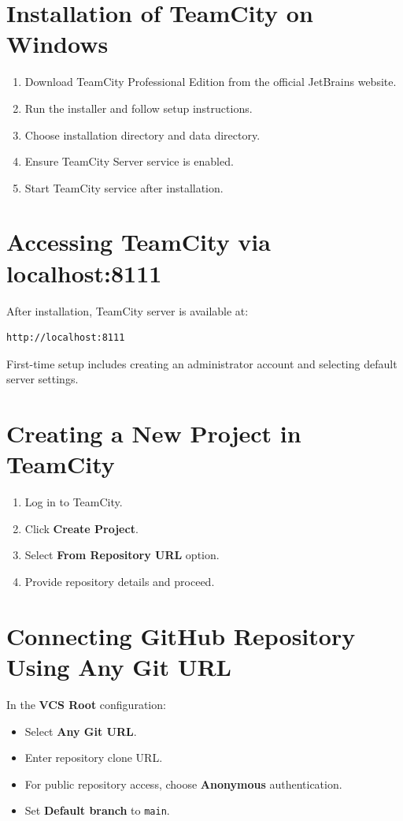 \documentclass[12pt,a4paper]{report}
\begin{document}
\section{Installation of TeamCity on Windows}
\begin{enumerate}[leftmargin=1.2cm]
    \item Download TeamCity Professional Edition from the official JetBrains website.
    \item Run the installer and follow setup instructions.
    \item Choose installation directory and data directory.
    \item Ensure TeamCity Server service is enabled.
    \item Start TeamCity service after installation.
\end{enumerate}

\section{Accessing TeamCity via localhost:8111}
After installation, TeamCity server is available at:
\begin{lstlisting}[language=bash,caption={Local TeamCity URL}]
http://localhost:8111
\end{lstlisting}
First-time setup includes creating an administrator account and selecting default server settings.

\section{Creating a New Project in TeamCity}
\begin{enumerate}[leftmargin=1.2cm]
    \item Log in to TeamCity.
    \item Click \textbf{Create Project}.
    \item Select \textbf{From Repository URL} option.
    \item Provide repository details and proceed.
\end{enumerate}

\section{Connecting GitHub Repository Using Any Git URL}
In the \textbf{VCS Root} configuration:
\begin{itemize}[leftmargin=1.2cm]
    \item Select \textbf{Any Git URL}.
    \item Enter repository clone URL.
    \item For public repository access, choose \textbf{Anonymous} authentication.
    \item Set \textbf{Default branch} to \texttt{main}.
\end{itemize}
\end{document}
